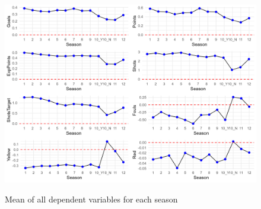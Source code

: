 \begin{figure}[h!]
    \centering
    \caption{Mean of all dependent variables for each season}
    \includegraphics[width=1\textwidth]{Figures/Extended_plot.png}
    \label{fig:extend}
\end{figure}

\newpage


